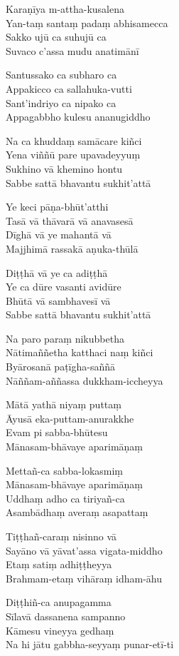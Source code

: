 \begin{paritta}
Karaṇīya m-attha-kusalena\\
Yan-taṃ santaṃ padaṃ abhisamecca\\
Sakko ujū ca suhujū ca\\
Suvaco c'assa mudu anatimānī

Santussako ca subharo ca\\
Appakicco ca sallahuka-vutti\\
Sant'indriyo ca nipako ca\\
Appagabbho kulesu ananugiddho

Na ca khuddaṃ samācare kiñci\\
Yena viññū pare upavadeyyuṃ\\
Sukhino vā khemino hontu\\
Sabbe sattā bhavantu sukhit'attā

Ye keci pāṇa-bhūt'atthi\\
Tasā vā thāvarā vā anavasesā\\
Dīghā vā ye mahantā vā\\
Majjhimā rassakā aṇuka-thūlā

Diṭṭhā vā ye ca adiṭṭhā\\
Ye ca dūre vasanti avidūre\\
Bhūtā vā sambhavesī vā\\
Sabbe sattā bhavantu sukhit'attā

Na paro paraṃ nikubbetha\\
Nātimaññetha katthaci naṃ kiñci\\
Byārosanā paṭīgha-saññā\\
Nāññam-aññassa dukkham-iccheyya

Mātā yathā niyaṃ puttaṃ\\
Āyusā eka-puttam-anurakkhe\\
Evam pi sabba-bhūtesu\\
Mānasam-bhāvaye aparimāṇaṃ

Mettañ-ca sabba-lokasmiṃ\\
Mānasam-bhāvaye aparimāṇaṃ\\
Uddhaṃ adho ca tiriyañ-ca\\
Asambādhaṃ averaṃ asapattaṃ

Tiṭṭhañ-caraṃ nisinno vā\\
Sayāno vā yāvat'assa vigata-middho\\
Etaṃ satiṃ adhiṭṭheyya\\
Brahmam-etaṃ vihāraṃ idham-āhu

Diṭṭhiñ-ca anupagamma\\
Sīlavā dassanena sampanno\\
Kāmesu vineyya gedhaṃ\\
Na hi jātu gabbha-seyyaṃ punar-etī-ti

\end{paritta}

